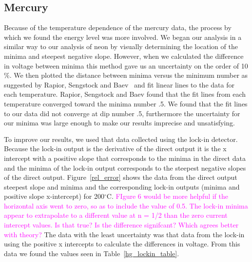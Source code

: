 \documentclass[prb,preprint]{revtex4-1}
\begin{document}
\subsection{Mercury}

Because of the temperature dependence of the mercury data, the process by which we found the energy level was more involved. We began our analysis in a similar way to our analysis of neon by visually determining the location of the minima and steepest negative slope. However, when we calculated the difference in voltage between minima this method gave us an uncertainty on the order of 10$\%$. We then plotted the distance between minima versus the minimum number as suggested by Rapior, Sengstock and Baev~\cite{newfeatures} and fit linear lines to the data for each temperature. Rapior, Sengstock and Baev found that the fit lines from each temperature converged toward the minima number .5. We found that the fit lines to our data did not converge at dip number .5, furthermore the uncertainty for our minima was large enough to make our results imprecise and unsatisfying.

To improve our results, we used that data collected using the lock-in detector. Because the lock-in output is the derivative of the direct output it is the x intercept with a positive slope that corresponds to the minima in the direct data and the minima of the lock-in output corresponds to the steepest negative slopes of the direct output. Figure~\ref{rel_error} shows the data from the direct output steepest slope and minima and the corresponding lock-in outputs (minima and positive slope x-intercept) for 200$^{\circ}$C.  \textcolor{magenta}{FIgure 6 would be more helpful if the horizontal axis went to zero, so as to include the value of 0.5.  The lock-in minima appear to extrapolate to a different value at n = 1/2 than the zero current intercept values. Is that true? Is the difference signifcant? Which agrees better with theory?  } The data with the least uncertainty was that data from the lock-in using the positive x intercepts to calculate the differences in voltage. From this data we found the values seen in Table~\ref{hg_lockin_table}.
\end{document}
